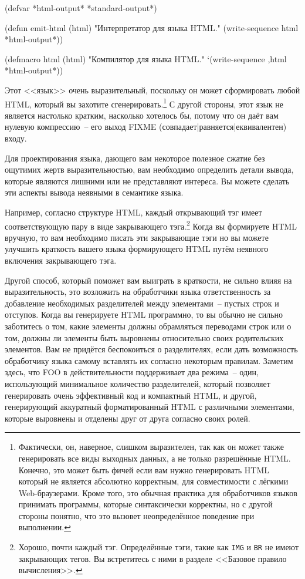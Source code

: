 \begin{myverb}
(defvar *html-output* *standard-output*)

(defun emit-html (html)
  "Интерпретатор для языка HTML."
  (write-sequence html *html-output*))

(defmacro html (html)
  "Компилятор для языка HTML."
  `(write-sequence ,html *html-output*))
\end{myverb}

Этот <<язык>> очень выразительный, поскольку он может сформировать любой HTML, который вы
захотите сгенерировать.\footnote{Фактически, он, наверное, слишком выразителен, так как он
  может также генерировать все виды выходных данных, а не только разрешённые
  HTML. Конечно, это может быть фичей если вам нужно генерировать HTML который не является
  абсолютно корректным, для совместимости с лёгкими Web-браузерами. Кроме того, это
  обычная практика для обработчиков языков принимать программы, которые синтаксически
  корректны, но с другой стороны понятно, что это вызовет неопределённое поведение при
  выполнении.} С другой стороны, этот язык не является настолько кратким, насколько
хотелось бы, потому что он даёт вам нулевую компрессию~-- его выход FIXME
(совпадает|равняется|еквивалентен) входу.

Для проектирования языка, дающего вам некоторое полезное сжатие без ощутимих жертв
выразительностью, вам необходимо определить детали вывода, которые являются лишними или не
представляют интереса. Вы можете сделать эти аспекты вывода неявными в семантике языка.

Например, согласно структуре HTML, каждый открывающий тэг имеет соответствующую пару в
виде закрывающего тэга.\footnote{Хорошо, почти каждый тэг. Определённые тэги, такие как
  \lstinline{IMG} и \lstinline{BR} не имеют закрывающих тегов.  Вы встретитесь с ними в разделе
  <<Базовое правило вычисления>>.} Когда вы формируете HTML вручную, то вам необходимо
писать эти закрывающие тэги но вы можете улучшить краткость вашего языка формирующего HTML
путём неявного включения закрывающего тэга.

Другой способ, который поможет вам выиграть в краткости, не сильно влияя на
выразительность, это возложить на обработчики языка ответственность за добавление
необходимых разделителей между элементами~-- пустых строк и отступов. Когда вы генерируете
HTML программно, то вы обычно не сильно заботитесь о том, какие элементы должны
обрамляться переводами строк или о том, должны ли элементы быть выровнены относительно
своих родительских элементов. Вам не придётся беспокоиться о разделителях, если дать
возможность обработчику языка самому вставлять их согласно некоторым правилам. Заметим
здесь, что FOO в действительности поддерживает два режима~-- один, использующий
минимальное количество разделителей, который позволяет генерировать очень эффективный код
и компактный HTML, и другой, генерирующий аккуратный форматированный HTML с различными
элементами, которые выровнены и отделены друг от друга согласно своих ролей.

